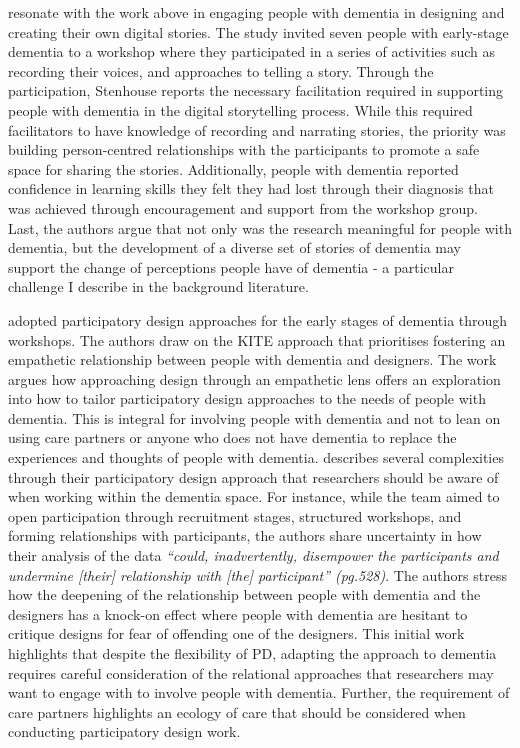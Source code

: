 \cite{stenhouse2013dangling} resonate with the work above in engaging people with dementia in designing and creating their own digital stories. The study invited seven people with early-stage dementia to a workshop where they participated in a series of activities such as recording their voices, and approaches to telling a story. Through the participation, Stenhouse reports the necessary facilitation required in supporting people with dementia in the digital storytelling process. While this required facilitators to have knowledge of recording and narrating stories, the priority was building person-centred relationships with the participants to promote a safe space for sharing the stories. Additionally, people with dementia reported confidence in learning skills they felt they had lost through their diagnosis that was achieved through encouragement and support from the workshop group. Last, the authors argue that not only was the research meaningful for people with dementia, but the development of a diverse set of stories of dementia may support the change of perceptions people have of dementia - a particular challenge I describe in the background literature. 

\cite{lindsay_empathy_2012} adopted participatory design approaches for the early stages of dementia through workshops. The authors draw on the KITE approach that prioritises fostering an empathetic relationship between people with dementia and designers. The work argues how approaching design through an empathetic lens offers an exploration into how to tailor participatory design approaches to the needs of people with dementia. This is integral for involving people with dementia and not to lean on using care partners or anyone who does not have dementia to replace the experiences and thoughts of people with dementia. \cite{lindsay_empathy_2012}  describes several complexities through their participatory design approach that researchers should be aware of when working within the dementia space. For instance, while the team aimed to open participation through recruitment stages, structured workshops, and forming relationships with participants, the authors share uncertainty in how their analysis of the data \textit{``could, inadvertently, disempower the participants and undermine [their] relationship with [the] participant'' (pg.528)}. The authors stress how the deepening of the relationship between people with dementia and the designers has a knock-on effect where people with dementia are hesitant to critique designs for fear of offending one of the designers. This initial work highlights that despite the flexibility of PD, adapting the approach to dementia requires careful consideration of the relational approaches that researchers may want to engage with to involve people with dementia. Further, the requirement of care partners highlights an ecology of care that should be considered when conducting participatory design work.

